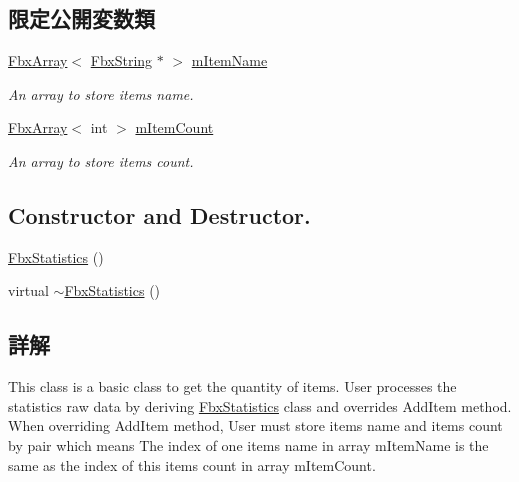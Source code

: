 \subsection*{限定公開変数類}
\begin{DoxyCompactItemize}
\item 
\hyperlink{class_fbx_array}{Fbx\+Array}$<$ \hyperlink{class_fbx_string}{Fbx\+String} $\ast$ $>$ \hyperlink{class_fbx_statistics_a91d987cd85cf3e567b9c309c9389f02d}{m\+Item\+Name}
\begin{DoxyCompactList}\small\item\em An array to store item\textquotesingle{}s name. \end{DoxyCompactList}\item 
\hyperlink{class_fbx_array}{Fbx\+Array}$<$ int $>$ \hyperlink{class_fbx_statistics_a9754af27b7b5d98fb085595e633370e8}{m\+Item\+Count}
\begin{DoxyCompactList}\small\item\em An array to store item\textquotesingle{}s count. \end{DoxyCompactList}\end{DoxyCompactItemize}
\subsection*{Constructor and Destructor.}
\begin{DoxyCompactItemize}
\item 
\hyperlink{class_fbx_statistics_a0eeeff235df61aa34125ff7bb846a05d}{Fbx\+Statistics} ()
\item 
virtual \hyperlink{class_fbx_statistics_afabf149366b975f0c5fdc59433c1858e}{$\sim$\+Fbx\+Statistics} ()
\end{DoxyCompactItemize}


\subsection{詳解}
This class is a basic class to get the quantity of items. User processes the statistics raw data by deriving \hyperlink{class_fbx_statistics}{Fbx\+Statistics} class and overrides {\ttfamily Add\+Item} method. When overriding {\ttfamily Add\+Item} method, User must store item\textquotesingle{}s name and item\textquotesingle{}s count by pair which means The index of one item\textquotesingle{}s name in array {\ttfamily m\+Item\+Name} is the same as the index of this item\textquotesingle{}s count in array {\ttfamily m\+Item\+Count}.


